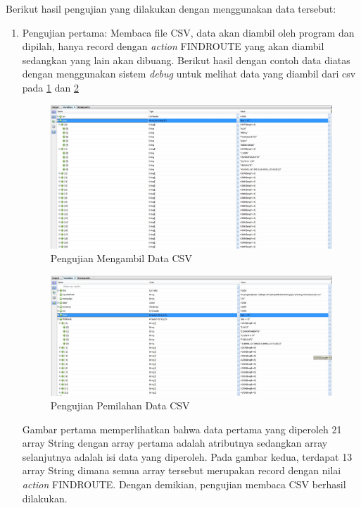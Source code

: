 Berikut hasil pengujian yang dilakukan dengan menggunakan data tersebut:
\begin{enumerate}
	\item Pengujian pertama: Membaca file CSV, data akan diambil oleh program dan dipilah, hanya record dengan \textsl{action} FINDROUTE yang akan diambil sedangkan yang lain akan dibuang. Berikut hasil dengan contoh data diatas dengan menggunakan sistem \textsl{debug} untuk melihat data yang diambil dari csv pada \ref{fig:Pengujian1} dan \ref{fig:Pengujian12}
	
	\begin{figure}[H]
	\centering
	\includegraphics[scale=0.4]{Gambar/pengujian1.jpg}
	\caption[Pengujian Mengambil Data CSV]{Pengujian Mengambil Data CSV} 
	\label{fig:Pengujian1}
	\end{figure}

	\begin{figure}[H]
	\centering
	\includegraphics[scale=0.4]{Gambar/pengujian12.jpg}
	\caption[Pengujian Pemilahan Data CSV]{Pengujian Pemilahan Data CSV} 
	\label{fig:Pengujian12}
	\end{figure}

	Gambar pertama memperlihatkan bahwa data pertama yang diperoleh 21 array String dengan array pertama adalah atributnya sedangkan array selanjutnya adalah isi data yang diperoleh. Pada gambar kedua, terdapat 13 array String dimana semua array tersebut merupakan record dengan nilai \textsl{action} FINDROUTE. Dengan demikian, pengujian membaca CSV berhasil dilakukan.


\end{enumerate}
